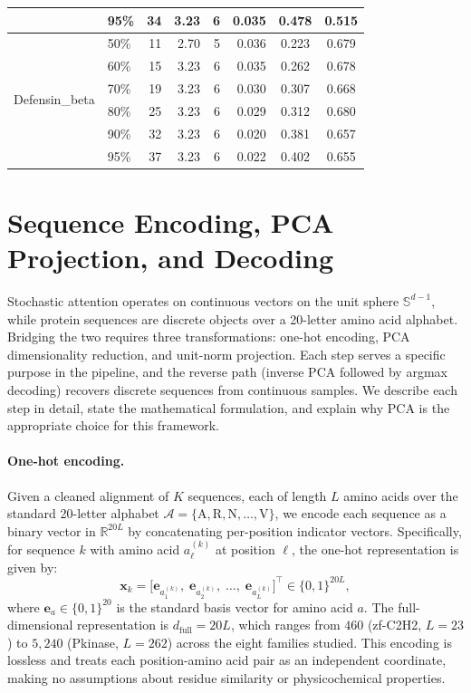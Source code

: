 \begin{table}[p]
\begin{tabular}{@{}llrrrrcc@{}}
 & 95\% &  34 & 3.23 &  6 & 0.035 & 0.478 & 0.515 \\
\midrule
\multirow{6}{*}{Defensin\_beta}
 & 50\% &  11 & 2.70 &  5 & 0.036 & 0.223 & 0.679 \\
 & 60\% &  15 & 3.23 &  6 & 0.035 & 0.262 & 0.678 \\
 & 70\% &  19 & 3.23 &  6 & 0.030 & 0.307 & 0.668 \\
\cmidrule{2-8}
 & 80\% &  25 & 3.23 &  6 & 0.029 & 0.312 & 0.680 \\
 & 90\% &  32 & 3.23 &  6 & 0.020 & 0.381 & 0.657 \\
 & 95\% &  37 & 3.23 &  6 & 0.022 & 0.402 & 0.655 \\
\bottomrule
\end{tabular}
\end{table}

\section{Sequence Encoding, PCA Projection, and Decoding}\label{app:pca}

Stochastic attention operates on continuous vectors on the unit sphere $\mathbb{S}^{d-1}$, while protein sequences are discrete objects over a 20-letter amino acid alphabet. Bridging the two requires three transformations: one-hot encoding, PCA dimensionality reduction, and unit-norm projection. Each step serves a specific purpose in the pipeline, and the reverse path (inverse PCA followed by argmax decoding) recovers discrete sequences from continuous samples. We describe each step in detail, state the mathematical formulation, and explain why PCA is the appropriate choice for this framework.

\paragraph{One-hot encoding.}
Given a cleaned alignment of $K$ sequences, each of length $L$ amino acids over the standard 20-letter alphabet $\mathcal{A} = \{\text{A}, \text{R}, \text{N}, \ldots, \text{V}\}$, we encode each sequence as a binary vector in $\mathbb{R}^{20L}$ by concatenating per-position indicator vectors. Specifically, for sequence $k$ with amino acid $a_\ell^{(k)}$ at position $\ell$, the one-hot representation is given by:
\begin{equation}
    \mathbf{x}_k = \bigl[\mathbf{e}_{a_1^{(k)}},\; \mathbf{e}_{a_2^{(k)}},\; \ldots,\; \mathbf{e}_{a_L^{(k)}}\bigr]^\top \in \{0,1\}^{20L},
\end{equation}
where $\mathbf{e}_a \in \{0,1\}^{20}$ is the standard basis vector for amino acid $a$. The full-dimensional representation is $d_{\mathrm{full}} = 20L$, which ranges from $460$ (zf-C2H2, $L{=}23$) to $5{,}240$ (Pkinase, $L{=}262$) across the eight families studied. This encoding is lossless and treats each position-amino acid pair as an independent coordinate, making no assumptions about residue similarity or physicochemical properties.

